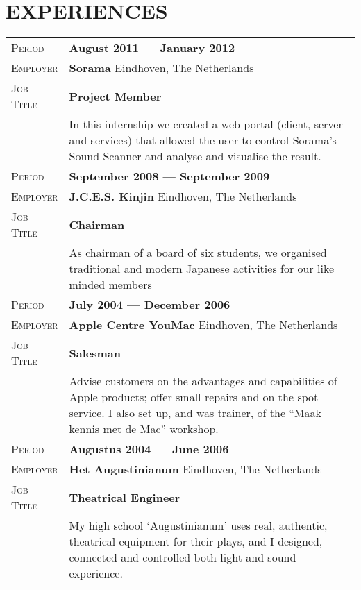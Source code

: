 \documentclass[a4paper, article, 10pt]{memoir}                                  %
\newcommand{\gray}{\rowcolor[gray]{.90}}                                        %
\newcommand{\heading}[2]{                                                       %
    \section{
        {\fontsize{18}{\lineskip}\textbf{#1}}{\fontsize{12}{\lineskip}\textbf{#2}}}
        }
\begin{document}
\textsc{\color{myblue} } \vspace{2ex}             %


    \heading{E}{XPERIENCES}
        \begin{tabularx}{0.97\linewidth}{>{\raggedleft\scshape}p{2.5cm}X}
            \gray Period    & \textbf{August 2011 --- January 2012}\\
            \gray Employer  & \textbf{Sorama} \hfill Eindhoven, The Netherlands\\
            \gray Job Title & \textbf{Project Member}\\ %
                            & In this internship we created a web portal (client, server and services) that allowed the user to control Sorama's Sound Scanner and analyse and visualise the result.\\
            \gray Period    & \textbf{September 2008 --- September 2009}\\
            \gray Employer  & \textbf{J.C.E.S. Kinjin} \hfill Eindhoven, The Netherlands\\
            \gray Job Title & \textbf{Chairman}\\
                            & As chairman of a board of six students, we organised traditional and modern Japanese activities for our like minded members\\
        \gray Period        & \textbf{July 2004 --- December 2006}\\
        \gray Employer      & \textbf{Apple Centre YouMac} \hfill Eindhoven, The Netherlands\\
        \gray Job Title     & \textbf{Salesman}\\
                            & Advise customers on the advantages and capabilities of Apple products; offer small repairs and on the spot service. I also set up, and was trainer, of the ``Maak kennis met de Mac'' workshop.\\
        \gray Period        & \textbf{Augustus 2004 --- June 2006}\\
        \gray Employer      & \textbf{Het Augustinianum} \hfill Eindhoven, The Netherlands\\
        \gray Job Title     & \textbf{Theatrical Engineer}\\
                            & My high school `Augustinianum' uses real, authentic, theatrical equipment for their plays, and I designed, connected and controlled both light and sound experience.\\


        \end{tabularx}
\end{document}
